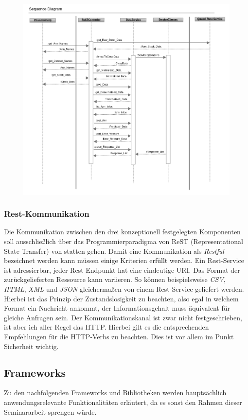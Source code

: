 \begin{figure}
\includegraphics[width=15cm]{sequence_dia_rest_env.png}
\end{figure}


\subsubsection{Rest-Kommunikation}
Die Kommunikation zwischen den drei konzeptionell festgelegten Komponenten soll ausschließlich über das Programmierparadigma von ReST (Representational State Transfer) von statten gehen. Damit eine Kommunikation als \emph{Restful} bezeichnet werden kann müssen einige Kriterien erfüllt werden. Ein Rest-Service ist adressierbar, jeder Rest-Endpunkt hat eine eindeutige URI. Das Format der zurückgelieferten Ressource kann variieren. So können beispielsweise \emph{CSV}, \emph{HTML}, \emph{XML} und \emph{JSON} gleichermaßen von einem Rest-Service geliefert werden. Hierbei ist das Prinzip der Zustandslosigkeit zu beachten, also egal in welchem Format ein Nachricht ankommt, der Informationsgehalt muss äquivalent für gleiche Anfragen sein. Der Kommunikationskanal ist zwar nicht festgeschrieben, ist aber ich aller Regel das HTTP. Hierbei gilt es die entsprechenden Empfehlungen für die HTTP-Verbs zu beachten. Dies ist vor allem im Punkt Sicherheit wichtig.   

\subsection{Frameworks}
Zu den nachfolgenden Frameworks und Bibliotheken werden hauptsächlich anwendungsrelevante Funktionalitäten erläutert, da es sonst den Rahmen dieser Seminararbeit sprengen würde.

